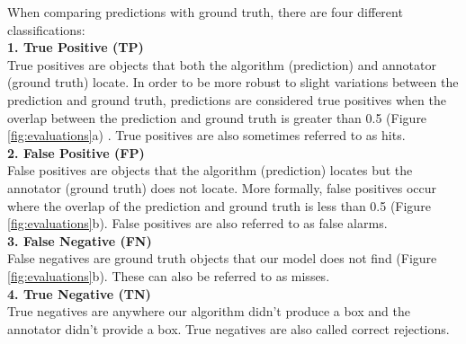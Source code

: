 \documentclass{article}
\begin{document}
When comparing predictions with ground truth, there are four different classifications: \\

\textbf{1. \hspace{0.25cm} True Positive (TP)}\\
True positives are objects that both the algorithm (prediction) and annotator (ground truth) locate. In order to be more robust to slight variations between the prediction and ground truth, predictions are considered true positives when the overlap between the prediction and ground truth is greater than 0.5 (Figure \ref{fig:evaluations}a) . True positives are also sometimes referred to as hits.\\

\textbf{2. \hspace{0.25cm} False Positive (FP)}\\
False positives are objects that the algorithm (prediction) locates but the annotator (ground truth) does not locate. More formally, false positives occur where the overlap of the prediction and ground truth is less than 0.5 (Figure \ref{fig:evaluations}b). False positives are also referred to as false alarms.\\

\textbf{3. \hspace{0.25cm} False Negative (FN)}\\
False negatives are ground truth objects that our model does not find (Figure \ref{fig:evaluations}b). These can also be referred to as misses.\\

\textbf{4. \hspace{0.25cm} True Negative (TN)}\\
True negatives are anywhere our algorithm didn’t produce a box and the annotator didn’t provide a box. True negatives are also called correct rejections.\\
\end{document}
